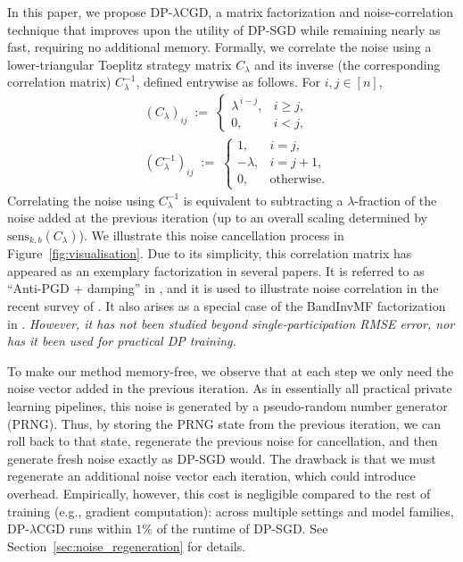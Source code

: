 \documentclass{article}
\theoremstyle{plain}
\theoremstyle{definition}
\theoremstyle{remark}
\newcommand{\method}{DP-$\lambda$CGD\xspace}
\begin{document}
In this paper, we propose \method, a matrix factorization and noise-correlation technique
that improves upon the utility of DP-SGD while remaining nearly as fast, requiring no
additional memory. Formally, we correlate the noise using a lower-triangular Toeplitz
strategy matrix $C_\lambda$ and its inverse (the corresponding correlation matrix)
$C_\lambda^{-1}$, defined entrywise as follows. For $i,j \in [n]$,
\begin{align}
\label{eq:C_lambda}
    &(C_\lambda)_{ij}
    \;:=\;
    \begin{cases}
        \lambda^{\,i-j}, & i \ge j,\\
        0, & i < j,
    \end{cases}\\
    &(C_\lambda^{-1})_{ij}
    \;:=\;
    \begin{cases}
        1, & i=j,\\
        -\lambda, & i=j+1,\\
        0, & \text{otherwise}.
    \end{cases}
\end{align}
Correlating the noise using $C_{\lambda}^{-1}$ is equivalent to subtracting a
$\lambda$-fraction of the noise added at the previous iteration (up to an overall
scaling determined by $\mathrm{sens}_{k,b}(C_{\lambda})$). We illustrate this noise
cancellation process in Figure~\ref{fig:visualisation}. Due to its simplicity, this correlation matrix has appeared as an exemplary factorization in several papers. It is referred to as ``Anti-PGD + damping'' in \citet{choquette2023correlated}, and it is used to illustrate noise correlation in the recent survey of \citet{pillutla2025correlated}. It also arises as a special case of the BandInvMF factorization in \citet{kalinin2025back}. \emph{However, it has not been studied beyond single-participation RMSE error, nor has it been used for practical DP training.}


To make our method memory-free, we observe that at each step we only need the noise
vector added in the previous iteration. As in essentially all practical private learning
pipelines, this noise is generated by a pseudo-random number generator (PRNG). Thus, by
storing the PRNG state from the previous iteration, we can roll back to that state,
regenerate the previous noise for cancellation, and then generate fresh noise exactly as
DP-SGD would. The drawback is that we must regenerate an additional noise vector each iteration, which
could introduce overhead. Empirically, however, this cost is negligible compared to the
rest of training (e.g., gradient computation): across multiple settings and model
families, \method runs within $1\%$ of the runtime of DP-SGD. See
Section~\ref{sec:noise_regeneration} for details.
\end{document}
